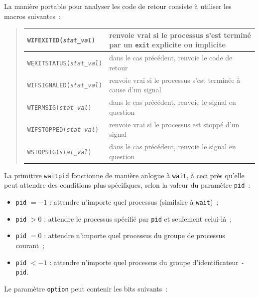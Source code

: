 \documentclass [twoside] {report}
\begin{document}
La manière portable pour analyser les code de retour consiste à
utiliser les macros suivantes~:

{\small
\begin {quote}
    \begin {tabular} {|l|p{70mm}|} \hline
	\texttt {WIFEXITED(\emph {stat\_val})} &
	    renvoie vrai si le processus s'est terminé par un
	    \texttt {exit} explicite ou implicite
	    \\ \hline
	\texttt {WEXITSTATUS(\emph {stat\_val})} &
	    dans le cas précédent, renvoie le code de retour
	    \\ \hline
	\texttt {WIFSIGNALED(\emph {stat\_val})} &
	    renvoie vrai si le processus s'est terminée à cause
	    d'un signal
	    \\ \hline
	\texttt {WTERMSIG(\emph {stat\_val})} &
	    dans le cas précédent, renvoie le signal en question
	    \\ \hline
	\texttt {WIFSTOPPED(\emph {stat\_val})} &
	    renvoie vrai si le processus est stoppé
	    d'un signal
	    \\ \hline
	\texttt {WSTOPSIG(\emph {stat\_val})} &
	    dans le cas précédent, renvoie le signal en question
	    \\ \hline
    \end {tabular}
\end {quote}
}

La primitive \texttt {waitpid} fonctionne de manière anlogue à \texttt {wait},
à ceci près qu'elle peut attendre des conditions plus spécifiques, selon
la valeur du paramètre \texttt {pid}~:

\begin {itemize}
    \item \texttt {pid} $= -1$ :  attendre n'importe quel
	processus (similaire à \texttt {wait})~;

    \item \texttt {pid} $> 0$ :  attendre le processus
	spécifié par \texttt {pid} et seulement celui-là~;

    \item \texttt {pid} $= 0$ :  attendre n'importe quel
	processus du groupe de processus courant~;

    \item \texttt {pid} $< -1$ :  attendre n'importe quel
	processus du groupe d'identificateur \texttt {-pid}.

\end {itemize}

Le paramètre \texttt {option} peut contenir les bits suivants~:
\end{document}
